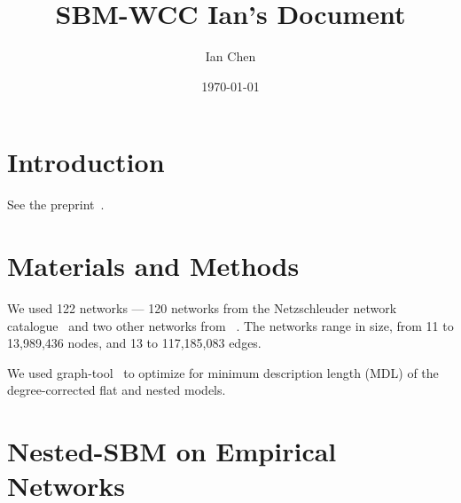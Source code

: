 \documentclass[aps,pre,superscriptaddress]{revtex4}
\begin{document}

\title{SBM-WCC Ian's Document}
\author{Ian Chen}
\noaffiliation
\date{\today}
\maketitle

\section{Introduction}
See the preprint~\cite{Park25-02}.

\section{Materials and Methods}

We used 122 networks --- 120 networks from the Netzschleuder network catalogue~\cite{Netzschleuder} and two other networks from ~\cite{Park24-11}.
The networks range in size, from 11 to 13,989,436 nodes, and 13 to 117,185,083 edges.

We used graph-tool~\cite{graph-tool} to optimize for minimum description length (MDL) of the degree-corrected flat and nested models.

\section{Nested-SBM on Empirical Networks}
\end{document}
